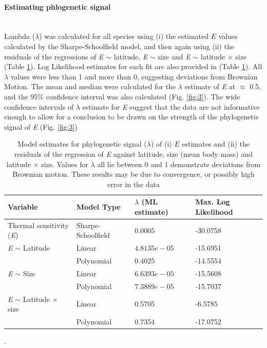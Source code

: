 \documentclass[11pt]{article}
\begin{document}
\begin{flushleft}
\paragraph{Estimating phlogenetic signal}\mbox{}\\
Lambda ($\lambda$) was calculated for all species using (i) the estimated \emph{$E$} values calculated by the Sharpe-Schoolfield model, and then again using (ii) the residuals of the regressions of \emph{E} $\sim$ latitude, \emph{E} $\sim$ size and \emph{E} $\sim$ latitude  $\times$ size (Table \ref{table:1}). Log Likelihood estimates for each fit are also provided in (Table \ref{table:1}). All $\lambda$ values were less than 1 and more than 0, suggesting deviations from Brownian Motion. The mean and median were calculated for the $\lambda$ estimate of \emph{E} at $\approx$ 0.5, and the 95\% confidence interval was also calculated (Fig. \ref{fig:3}). The wide confidence intervals of $\lambda$ estimate for \emph{E} suggest that the data are not informative enough to allow for a conclusion to be drawn on the strength of the phylogenetic signal of \emph{E} (Fig. \ref{fig:3})
\linebreak

\begin{table}[!htbp]
\centering
\small
 \begin{tabular} {||p{3.7cm}p{2.9cm}p{2.5cm}p{3.2cm}||}
 \hline
 Variable & Model Type & $\lambda$ (ML estimate) & Max. Log Likelihood \\ [1.5ex] 
 \hline\hline
 Thermal sensitivity (\emph{E}) & Sharpe-Schoolfield & 0.0005 & -30.0758 \\
 \emph{E} $\sim$ Latitude & Linear & $4.8135e-05$ & -15.6951 \\ 
  & Polynomial & 0.4025 & -14.5554 \\
 \emph{E} $\sim$ Size & Linear & $6.6393e-05$ & -15.5608 \\
  & Polynomial & $7.3889e-05$ & -15.7037 \\
 \emph{E} $\sim$ Latitude $\times$ size & Linear & 0.5705 & -6.5785 \\ 
  & Polynomial &  0.7354 & -17.0752 \\ [2ex] 
 \hline
 \end{tabular}
 \caption{\label{table:1} Model estimates for phylogenetic signal ($\lambda$) of (i) \emph{$E$} estimates and (ii) the residuals of the regression of \emph{E} against latitude, size (mean body mass) and latitude $\times$ size. Values for $\lambda$ all lie between 0 and 1 demonstrate deviations from Brownian motion. These results may be due to convergence, or possibly high error in the data}.
\end{table}


\end{flushleft}
\end{document}
